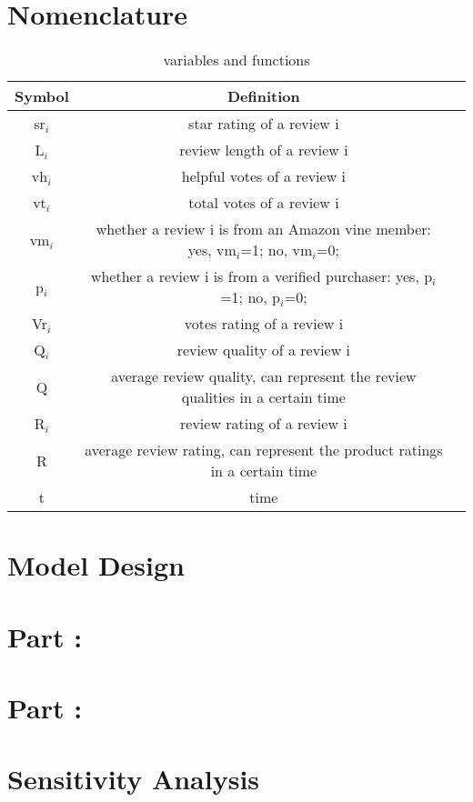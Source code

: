 \documentclass{mcmthesis}
\begin{document}
\section{Nomenclature}
\begin{table}[h]
  \centering
  \begin{tabular}{ccc}
    \hline
    Symbol & Definition\\
    \hline
    sr$_{i}$ & star rating of a review i\\
    L$_{i}$ & review length of a review i\\
    vh$_{i}$ & helpful votes of a review i\\
    vt$_{i}$ & total votes of a review i\\
    vm$_{i}$ & whether a review i is from an Amazon vine member: yes, vm$_{i}$=1; no, vm$_{i}$=0;\\
    p$_{i}$ & whether a review i is from a verified purchaser: yes, p$_{i}$=1; no, p$_{i}$=0;\\
    Vr$_{i}$ & votes rating of a review i\\
    Q$_{i}$ & review quality of a review i\\
    Q & average review quality, can represent the review qualities in a certain time\\
    R$_{i}$ & review rating of a review i\\
    R & average review rating, can represent the product ratings in a certain time\\
    t & time\\
	\hline
  \end{tabular}
  \caption{variables and functions}
\end{table}

\section{ Model Design }

\section{ Part \uppercase\expandafter{}:  }

\section{ Part \uppercase\expandafter{}:  }

\section{Sensitivity Analysis}
\end{document}
